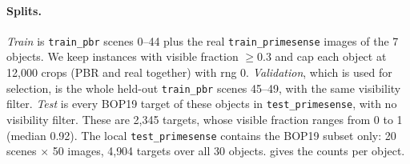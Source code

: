 \paragraph{Splits.}
\emph{Train} is \texttt{train\_pbr} scenes 0--44 plus the real \texttt{train\_primesense} images of the 7 objects. We keep instances with visible fraction $\ge0.3$ and cap each object at 12{,}000 crops (PBR and real together) with rng 0.
\emph{Validation}, which is used for selection, is the whole held-out \texttt{train\_pbr} scenes 45--49, with the same visibility filter.
\emph{Test} is every BOP19 target of these objects in \texttt{test\_primesense}, with no visibility filter. These are 2{,}345 targets, whose visible fraction ranges from 0 to 1 (median 0.92). The local \texttt{test\_primesense} contains the BOP19 subset only: 20 scenes $\times$ 50 images, 4{,}904 targets over all 30 objects.
 gives the counts per object.

\begin{table}[t]
  \centering\footnotesize
  \setlength{\tabcolsep}{3pt}
  \caption{\textbf{T-LESS} instances per object in our manifest. Validation is held-out PBR scenes 45--49; test is all BOP19 targets in the real Primesense test images.}
  \label{app:tab:tless}
\end{table}

